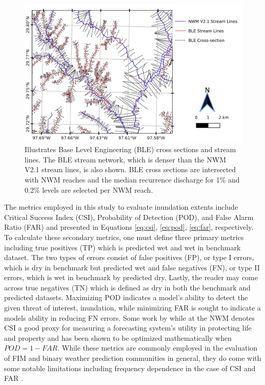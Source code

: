 \documentclass[draft]{dependencies/agujournal2019}
\begin{document}
%
\begin{figure}[h!]
\centering
\includegraphics[scale=1.0]{figures/ble_evaluation_method.jpg}
\caption{Illustrates Base Level Engineering (BLE) cross sections and stream lines. The BLE stream network, which is denser than the NWM V2.1 stream lines, is also shown. BLE cross sections are intersected with NWM reaches and the median recurrence discharge for 1\% and 0.2\% levels are selected per NWM reach. }
\label{fig:ble_evaluation_method}
\end{figure}
%
The metrics employed in this study to evaluate inundation extents include Critical Success Index (CSI), Probability of Detection (POD), and False Alarm Ratio (FAR) and presented in Equations \ref{eq:csi}, \ref{eq:pod}, \ref{eq:far}, respectively.
To calculate these secondary metrics, one must define three primary metrics including true positives (TP) which is predicted wet and wet in benchmark dataset.
The two types of errors consist of false positives (FP), or type I errors, which is dry in benchmark but predicted wet and false negatives (FN), or type II errors, which is wet in benchmark by predicted dry. 
Lastly, the reader may come across true negatives (TN) which is defined as dry in both the benchmark and predicted datasets.
Maximizing POD indicates a model's ability to detect the given threat of interest, inundation, while minimizing FAR is sought to indicate a models ability in reducing FN errors.
Some work by  while at the NWM denotes CSI a good proxy for measuring a forecasting system's utility in protecting life and property and has been shown to be optimized mathematically when $POD = 1 - FAR$.
While these metrics are commonly employed in the evaluation of FIM and binary weather prediction communities in general, they do come with some notable limitations including frequency dependence in the case of CSI and FAR \cite{gerapetritis2004behavior,stephens2014problems,schaefer1990critical,jolliffe2012forecast}.
\end{document}
